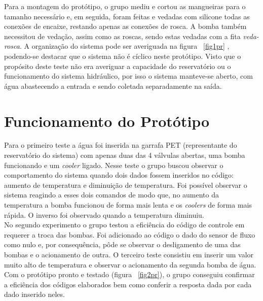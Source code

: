 Para a montagem do protótipo, o grupo mediu e cortou as mangueiras para o tamanho necessário e, em seguida, foram feitas e vedadas com silicone todas as conexões de encaixe, restando apenas as conexões de rosca. A bomba também necessitou de vedação, assim como as roscas, sendo estas vedadas com a fita \emph{veda-rosca}. A organização do sistema pode ser averiguada na figura ~\ref{fig1pr} , podendo-se destacar que o sistema não é cíclico neste protótipo. Visto que o propósito deste teste não era averiguar a capacidade do reservatório ou o funcionamento do sistema hidráulico, por isso o sistema manteve-se aberto, com água abastecendo a entrada e sendo coletada separadamente na saída.
\section{Funcionamento do Protótipo}
Para o primeiro teste a água foi inserida na garrafa PET (representante do reservatório do sistema) com apenas duas das 4 válvulas abertas, uma bomba funcionando e um \textit{cooler} ligado. Nesse teste o grupo buscou observar o comportamento do sistema quando dois dados fossem inseridos no código: aumento de temperatura e diminuição de temperatura. Foi possível observar o sistema reagindo a esses dois comandos de modo que, no aumento da temperatura a bomba funcionou de forma mais lenta e os \textit{coolers} de forma mais rápida. O inverso foi observado quando a temperatura diminuiu.\\
No segundo experimento o grupo testou a eficiência do código de controle em requerer a troca das bombas. Foi adicionado ao código o dado do sensor de fluxo como nulo e, por consequência, pôde se observar o desligamento de uma das bombas e o acionamento de outra.  
O terceiro teste consistiu em inserir um valor muito alto de temperatura e observar o acionamento da segunda bomba de água.\\
Com o protótipo pronto e testado (figura ~\ref{fig2pr}), o grupo conseguiu confirmar a eficiência dos códigos elaborados bem como conferir a resposta dada por cada dado inserido neles.
